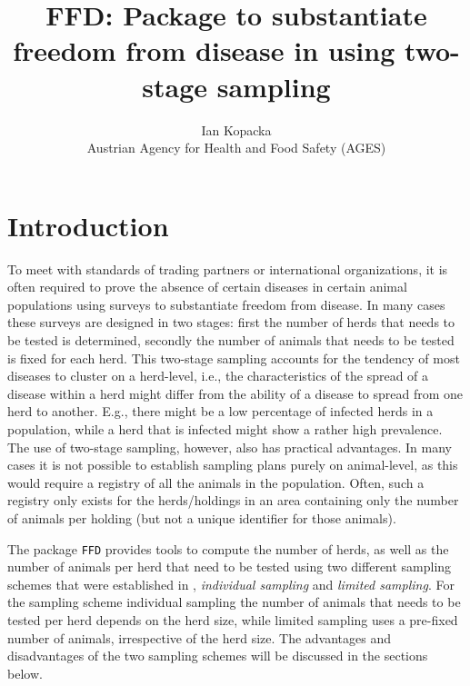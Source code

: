 \documentclass[nojss]{jss}
\title{FFD: Package to substantiate freedom from disease in 
\proglang{R} using two-stage sampling}
\author{Ian Kopacka\\Austrian Agency for Health and Food Safety (AGES)}
\begin{document}
%
%

%


\section{Introduction}
\label{sec:introduction}

To meet with standards of trading partners or international 
organizations, it is often required to prove the absence of certain 
diseases in certain animal populations using surveys to substantiate 
freedom from disease. In many cases these surveys are designed in 
two stages: first the number of herds that needs to be tested is 
determined, secondly the number of animals that needs to be tested 
is fixed for each herd. This two-stage sampling accounts for the 
tendency of most diseases to cluster on a herd-level, i.e., the 
characteristics of the spread of a disease within a herd might 
differ from the ability of a disease to spread from one herd to 
another. E.g., there might be a low percentage of infected herds in 
a population, while a herd that is infected might show a rather high 
prevalence. The use of two-stage sampling, however, also has 
practical advantages. In many cases it is not possible to establish 
sampling plans purely on animal-level, as this would require a 
registry of all the animals in the population. Often, such a 
registry only exists for the herds/holdings in an area containing 
only the number of animals per holding (but not a unique identifier 
for those animals). 

The package \texttt{FFD} provides tools to compute the number of 
herds, as well as the number of animals per herd that need to be 
tested using two different sampling schemes that were established in 
\cite{Ziller02}, \emph{individual sampling} and \emph{limited 
sampling}. For the sampling scheme individual sampling the number of 
animals that needs to be tested per herd depends on the herd size, 
while limited sampling uses a pre-fixed number of animals, 
irrespective of the herd size. The advantages and disadvantages of 
the two sampling schemes will be discussed in the sections below.  
\end{document}
